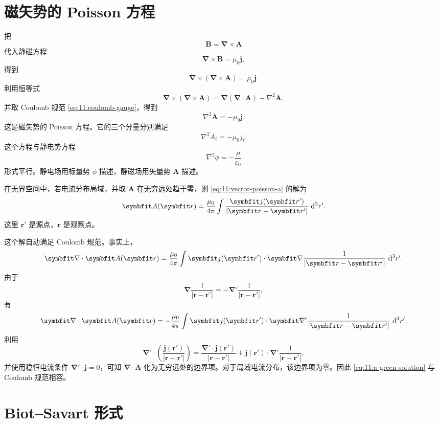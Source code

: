 \section{磁矢势的 Poisson 方程}

把
\[
\bm{B}
=
\bm{\nabla}\times\bm{A}
\]
代入静磁方程
\[
\bm{\nabla}\times\bm{B}
=
\mu_{0}\bm{j},
\]
得到
\[
\bm{\nabla}\times(\bm{\nabla}\times\bm{A})
=
\mu_{0}\bm{j}.
\]
利用恒等式
\[
\bm{\nabla}\times(\bm{\nabla}\times\bm{A})
=
\bm{\nabla}(\bm{\nabla}\cdot\bm{A})
-
\nabla^{2}\bm{A},
\]
并取 Coulomb 规范 \eqref{eq:11:coulomb-gauge}，得到
\begin{equation}
	\nabla^{2}\bm{A}
	=
	-\mu_{0}\bm{j}.
	\label{eq:11:vector-poisson-a}
\end{equation}
这是磁矢势的 Poisson 方程。它的三个分量分别满足
\[
\nabla^{2}A_{i}
=
-\mu_{0}j_{i}.
\]
这个方程与静电势方程
\[
\nabla^{2}\phi
=
-\frac{\rho}{\varepsilon_{0}}
\]
形式平行。静电场用标量势 $\phi$ 描述，静磁场用矢量势 $\bm{A}$ 描述。

在无界空间中，若电流分布局域，并取 $\bm{A}$ 在无穷远处趋于零，则 \eqref{eq:11:vector-poisson-a} 的解为
\begin{equation}
	\bm{A}(\bm{r})
	=
	\frac{\mu_{0}}{4\pi}
	\int
	\frac{\bm{j}(\bm{r}')}{|\bm{r}-\bm{r}'|}
	\,\dif^{3}r'.
	\label{eq:11:a-green-solution}
\end{equation}
这里 $\bm{r}'$ 是源点，$\bm{r}$ 是观察点。

这个解自动满足 Coulomb 规范。事实上，
\[
\bm{\nabla}\cdot\bm{A}(\bm{r})
=
\frac{\mu_{0}}{4\pi}
\int
\bm{j}(\bm{r}')\cdot
\bm{\nabla}
\frac{1}{|\bm{r}-\bm{r}'|}
\,\dif^{3}r'.
\]
由于
\[
\bm{\nabla}
\frac{1}{|\bm{r}-\bm{r}'|}
=
-\bm{\nabla}'
\frac{1}{|\bm{r}-\bm{r}'|},
\]
有
\[
\bm{\nabla}\cdot\bm{A}(\bm{r})
=
-\frac{\mu_{0}}{4\pi}
\int
\bm{j}(\bm{r}')\cdot
\bm{\nabla}'
\frac{1}{|\bm{r}-\bm{r}'|}
\,\dif^{3}r'.
\]
利用
\[
\bm{\nabla}'\cdot
\left(
\frac{\bm{j}(\bm{r}')}{|\bm{r}-\bm{r}'|}
\right)
=
\frac{\bm{\nabla}'\cdot\bm{j}(\bm{r}')}{|\bm{r}-\bm{r}'|}
+
\bm{j}(\bm{r}')\cdot
\bm{\nabla}'
\frac{1}{|\bm{r}-\bm{r}'|},
\]
并使用稳恒电流条件 $\bm{\nabla}'\cdot\bm{j}=0$，可知 $\bm{\nabla}\cdot\bm{A}$ 化为无穷远处的边界项。对于局域电流分布，该边界项为零。因此 \eqref{eq:11:a-green-solution} 与 Coulomb 规范相容。

\section{Biot--Savart 形式}

